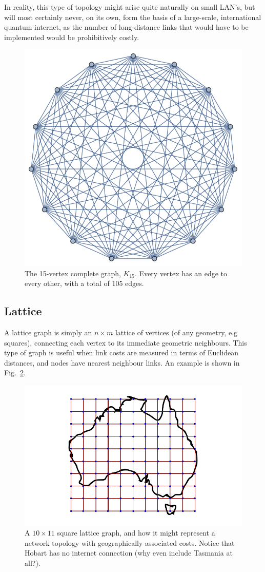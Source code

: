\documentclass[aps,rmp,twocolumn,amsmath,amssymb,nofootinbib,superscriptaddress]{revtex4}
\begin{document}
In reality, this type of topology might arise quite naturally on small LAN's, but will most certainly never, on its own, form the basis of a large-scale, international quantum internet, as the number of long-distance links that would have to be implemented would be prohibitively costly.

\begin{figure}[!htb]
\includegraphics[width=0.7\columnwidth]{K_15}
\caption{The 15-vertex complete graph, $K_{15}$. Every vertex has an edge to every other, with a total of 105 edges.} \label{fig:complete_graph}
\end{figure}

%
%

\subsection{Lattice}

A lattice graph is simply an \mbox{$n\times m$} lattice of vertices (of any geometry, e.g squares), connecting each vertex to its immediate geometric neighbours. This type of graph is useful when link costs are measured in terms of Euclidean distances, and nodes have nearest neighbour links. An example is shown in Fig.~\ref{fig:lattice}.

\begin{figure}[!htb]
\includegraphics[width=0.7\columnwidth]{lattice}
\caption{A \mbox{$10\times 11$} square lattice graph, and how it might represent a network topology with geographically associated costs. Notice that Hobart has no internet connection (why even include Tasmania at all?).} \label{fig:lattice}
\end{figure}
\end{document}
